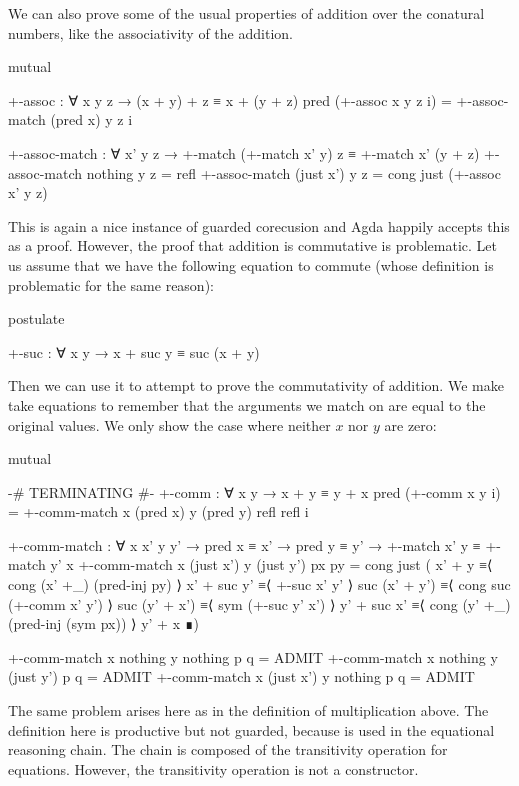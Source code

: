We can also prove some of the usual properties of addition over the conatural
numbers, like the associativity of the addition.
\begin{code}[hide]
mutual
\end{code}
\begin{code}
  +-assoc : ∀ x y z → (x + y) + z ≡ x + (y + z)
  pred (+-assoc x y z i) = +-assoc-match (pred x) y z i

  +-assoc-match :
    ∀ x' y z →
    +-match (+-match x' y) z ≡ +-match x' (y + z)
  +-assoc-match nothing    y z = refl
  +-assoc-match (just x')  y z = cong just (+-assoc x' y z)
\end{code}
This is again a nice instance of guarded corecusion and Agda happily accepts
this as a proof. However, the proof that addition is commutative is problematic.
Let us assume that we have the following equation to commute 
(whose definition is problematic for the same reason):
\begin{code}[hide]
postulate
\end{code}
\begin{code}
  +-suc : ∀ x y → x + suc y ≡ suc (x + y)
\end{code}
Then we can use it to attempt to prove the commutativity of addition. We make
 take equations to remember that the arguments we
match on are equal to the original values. We only show the case where neither
$x$ nor $y$ are zero:
\begin{code}[hide]
mutual
\end{code}
\begin{code}
  {-# TERMINATING #-}
  +-comm : ∀ x y → x + y ≡ y + x
  pred (+-comm x y i) =
    +-comm-match x (pred x) y (pred y) refl refl i

  +-comm-match :
    ∀ x x' y y' → pred x ≡ x' → pred y ≡ y' →
    +-match x' y ≡ +-match y' x
  +-comm-match x (just x') y (just y') px py =
    cong just
      (  x' + y         ≡⟨ cong (x' +_) (pred-inj py) ⟩
         x' + suc y'    ≡⟨ +-suc x' y' ⟩
         suc (x' + y')  ≡⟨ cong suc (+-comm x' y') ⟩
         suc (y' + x')  ≡⟨ sym (+-suc y' x') ⟩
         y' + suc x'    ≡⟨ cong (y' +_) (pred-inj (sym px)) ⟩
         y' + x         ∎)
\end{code}
\begin{code}[hide]
  +-comm-match x nothing y nothing p q = ADMIT
  +-comm-match x nothing y (just y') p q = ADMIT
  +-comm-match x (just x') y nothing p q = ADMIT
\end{code}
The same problem arises here as in the definition of multiplication above. The
definition here is productive but not guarded, because  is
used in the equational reasoning chain. The chain is composed of the transitivity
operation for equations. However, the transitivity operation is not a constructor.
